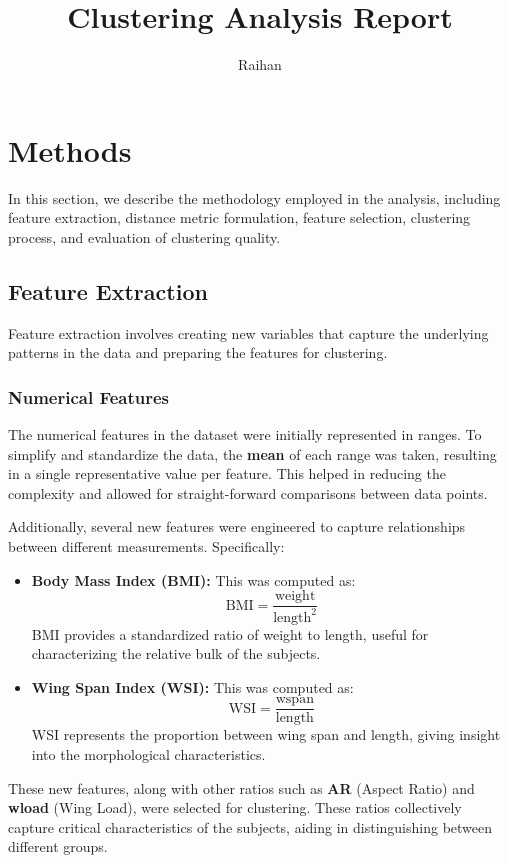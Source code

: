 \documentclass{article}
\title{Clustering Analysis Report}
\author{Raihan}
\date{}
\begin{document}
\maketitle

\section{Methods}
In this section, we describe the methodology employed in the analysis, including feature extraction, distance metric formulation, feature selection, clustering process, and evaluation of clustering quality.

\subsection{Feature Extraction}
Feature extraction involves creating new variables that capture the underlying patterns in the data and preparing the features for clustering.

\subsubsection{Numerical Features}
The numerical features in the dataset were initially represented in ranges. To simplify and standardize the data, the \textbf{mean} of each range was taken, resulting in a single representative value per feature. This helped in reducing the complexity and allowed for straight-forward comparisons between data points.

Additionally, several new features were engineered to capture relationships between different measurements. Specifically:

\begin{itemize}
    \item \textbf{Body Mass Index (BMI):} This was computed as:
    \[
    \text{BMI} = \frac{\text{weight}}{\text{length}^2}
    \]
    BMI provides a standardized ratio of weight to length, useful for characterizing the relative bulk of the subjects.

    \item \textbf{Wing Span Index (WSI):} This was computed as:
    \[
    \text{WSI} = \frac{\text{wspan}}{\text{length}}
    \]
    WSI represents the proportion between wing span and length, giving insight into the morphological characteristics.
\end{itemize}

These new features, along with other ratios such as \textbf{AR} (Aspect Ratio) and \textbf{wload} (Wing Load), were selected for clustering. These ratios collectively capture critical characteristics of the subjects, aiding in distinguishing between different groups.
\end{document}
